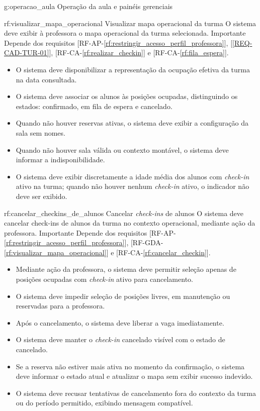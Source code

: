 \rfgruporeq
{g:operacao_aula}
{Operação da aula e painéis gerenciais}

\reqfuncfull
{rf:visualizar_mapa_operacional}
{Visualizar mapa operacional da turma}
{O sistema deve exibir à professora o mapa operacional da turma selecionada.}
{Importante}
{Depende dos requisitos [RF-AP-\ref{rf:restringir_acesso_perfil_professora}], [\ref{REQ-CAD-TUR-01}], [RF-CA-\ref{rf:realizar_checkin}] e [RF-CA-\ref{rf:fila_espera}].}
{\begin{itemize}[leftmargin=0.6cm]
    \item O sistema deve disponibilizar a representação da ocupação efetiva da turma na data consultada.
    \item O sistema deve associar os alunos às posições ocupadas, distinguindo os estados: confirmado, em fila de espera e cancelado.
    \item Quando não houver reservas ativas, o sistema deve exibir a configuração da sala sem nomes.
    \item Quando não houver sala válida ou contexto montável, o sistema deve informar a indisponibilidade.
    \item O sistema deve exibir discretamente a idade média dos alunos com \textit{check-in} ativo na turma; quando não houver nenhum \textit{check-in} ativo, o indicador não deve ser exibido.
\end{itemize}}

\reqfuncfull
{rf:cancelar_checkins_de_alunos}
{Cancelar \textit{check-ins} de alunos}
{O sistema deve cancelar check-ins de alunos da turma no contexto operacional, mediante ação da professora.}
{Importante}
{Depende dos requisitos [RF-AP-\ref{rf:restringir_acesso_perfil_professora}], [RF-GDA-\ref{rf:visualizar_mapa_operacional}] e [RF-CA-\ref{rf:cancelar_checkin}].}
{\begin{itemize}[leftmargin=0.6cm]
    \item Mediante ação da professora, o sistema deve permitir seleção apenas de posições ocupadas com \textit{check-in} ativo para cancelamento.
    \item O sistema deve impedir seleção de posições livres, em manutenção ou reservadas para a professora.
    \item Após o cancelamento, o sistema deve liberar a vaga imediatamente.
    \item O sistema deve manter o \textit{check-in} cancelado visível com o estado de cancelado.
    \item Se a reserva não estiver mais ativa no momento da confirmação, o sistema deve informar o estado atual e atualizar o mapa sem exibir sucesso indevido.
    \item O sistema deve recusar tentativas de cancelamento fora do contexto da turma ou do período permitido, exibindo mensagem compatível.
\end{itemize}}

